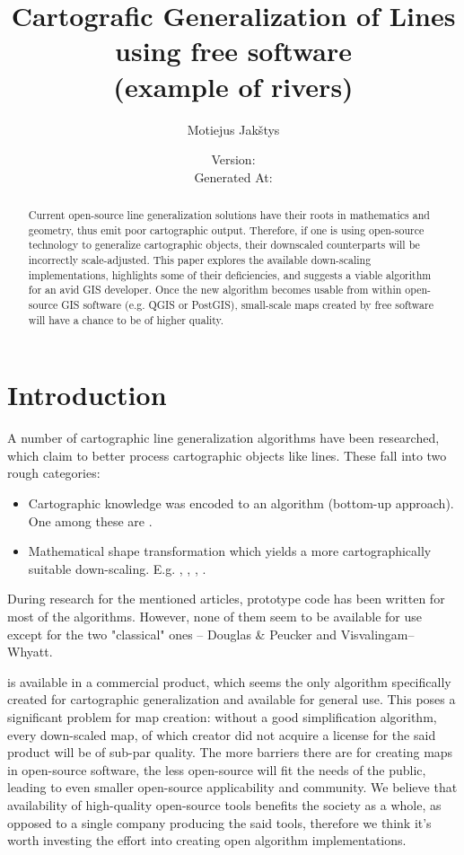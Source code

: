 \documentclass[a4paper]{article}
\title{
    Cartografic Generalization of Lines using free software \\
    (example of rivers) \\ \vspace{4mm}
}
\author{Motiejus Jakštys}
\date{
    \vspace{10mm}
    Version: \VCDescribe \\ \vspace{4mm}
    Generated At: \GeneratedAt
}
\newcommand{\DP}{Douglas \& Peucker}
\newcommand{\VW}{Visvalingam--Whyatt}
\begin{document}
\maketitle

\begin{abstract}
\label{sec:abstract}
Current open-source line generalization solutions have their roots in
    mathematics and geometry, thus emit poor cartographic output. Therefore, if
    one is using open-source technology to generalize cartographic objects,
    their downscaled counterparts will be incorrectly scale-adjusted. This
    paper explores the available down-scaling implementations, highlights some
    of their deficiencies, and suggests a viable algorithm for an avid GIS
    developer. Once the new algorithm becomes usable from within open-source
    GIS software (e.g. QGIS or PostGIS), small-scale maps created by free
    software will have a chance to be of higher quality.
\end{abstract}

\newpage

\tableofcontents
\listoffigures

\section{Introduction}
\label{sec:introduction}

A number of cartographic line generalization algorithms have been researched,
which claim to better process cartographic objects like lines. These fall into
two rough categories:
\begin{itemize}
    \item Cartographic knowledge was encoded to an algorithm (bottom-up
        approach). One among these are \cite{wang1998line}.
    \item Mathematical shape transformation which yields a more
        cartographically suitable down-scaling. E.g. \cite{jiang2003line},
        \cite{dyken2009simultaneous}, \cite{mustafa2006dynamic},
        \cite{nollenburg2008morphing}.
\end{itemize}

During research for the mentioned articles, prototype code has been written for
most of the algorithms. However, none of them seem to be available for use
except for the two "classical" ones -- {\DP} and {\VW}.

\cite{wang1998line} is available in a commercial product, which seems the only
algorithm specifically created for cartographic generalization and available
for general use. This poses a significant problem for map creation: without a
good simplification algorithm, every down-scaled map, of which creator did not
acquire a license for the said product will be of sub-par quality. The more
barriers there are for creating maps in open-source software, the less
open-source will fit the needs of the public, leading to even smaller
open-source applicability and community. We believe that availability of
high-quality open-source tools benefits the society as a whole, as opposed to a
single company producing the said tools, therefore we think it's worth
investing the effort into creating open algorithm implementations.
\end{document}
